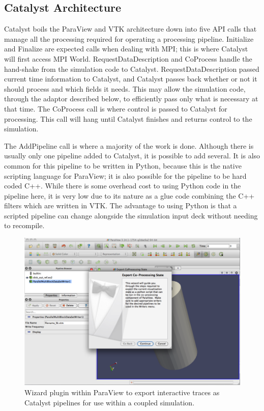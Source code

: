 \subsection{Catalyst Architecture}

Catalyst boils the ParaView and VTK architecture down into five API calls that
manage all the processing required for operating a processing pipeline.
Initialize and Finalize are expected calls when dealing with MPI; this is where
Catalyst will first access MPI World.  RequestDataDescription and CoProcess
handle the hand-shake from the simulation code to Catalyst.
RequestDataDescription passed current time information to Catalyst, and
Catalyst passes back whether or not it should process and which fields it
needs.  This may allow the simulation code, through the adaptor described
below, to efficiently pass only what is necessary at that time.  The CoProcess
call is where control is passed to Catalyst for processing.  This call will
hang until Catalyst finishes and returns control to the simulation.

The AddPipeline call is where a majority of the work is done.  Although there
is usually only one pipeline added to Catalyst, it is possible to add several.
It is also common for this pipeline to be written in Python, because this is
the native scripting language for ParaView; it is also possible for the
pipeline to be hard coded C++.  While there is some overhead cost to using
Python code in the pipeline here, it is very low due to its nature as a glue
code combining the C++ filters which are written in VTK.  The advantage to
using Python is that a scripted pipeline can change alongside the simulation
input deck without needing to recompile.

\begin{figure}[htb]
  \centering
  \includegraphics{figures/ScriptExport}
  \caption{Wizard plugin within ParaView to export interactive traces as 
Catalyst pipelines for use within a coupled simulation.}
  \label{fig:ScriptExport}
\end{figure}

